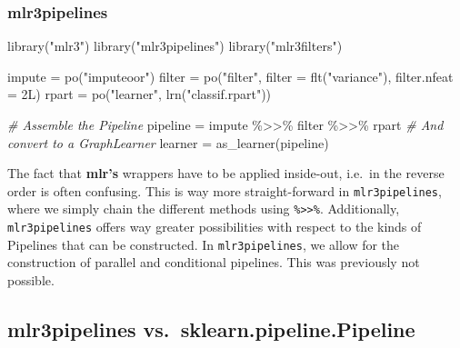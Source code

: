 \documentclass[
]{scrbook}
\newenvironment{Shaded}{\begin{snugshade}}{\end{snugshade}}
\newcommand{\AttributeTok}[1]{\textcolor[rgb]{0.77,0.63,0.00}{#1}}
\newcommand{\CommentTok}[1]{\textcolor[rgb]{0.56,0.35,0.01}{\textit{#1}}}
\newcommand{\FunctionTok}[1]{\textcolor[rgb]{0.00,0.00,0.00}{#1}}
\newcommand{\NormalTok}[1]{#1}
\newcommand{\OtherTok}[1]{\textcolor[rgb]{0.56,0.35,0.01}{#1}}
\newcommand{\SpecialCharTok}[1]{\textcolor[rgb]{0.00,0.00,0.00}{#1}}
\newcommand{\StringTok}[1]{\textcolor[rgb]{0.31,0.60,0.02}{#1}}
\renewenvironment{Shaded} {\begin{snugshade}\small} {\end{snugshade}}
\begin{document}
\hypertarget{mlr3pipelines}{%
\subsubsection{mlr3pipelines}\label{mlr3pipelines}}

\begin{Shaded}
\begin{Highlighting}[]
\FunctionTok{library}\NormalTok{(}\StringTok{"mlr3"}\NormalTok{)}
\FunctionTok{library}\NormalTok{(}\StringTok{"mlr3pipelines"}\NormalTok{)}
\FunctionTok{library}\NormalTok{(}\StringTok{"mlr3filters"}\NormalTok{)}

\NormalTok{impute }\OtherTok{=} \FunctionTok{po}\NormalTok{(}\StringTok{"imputeoor"}\NormalTok{)}
\NormalTok{filter }\OtherTok{=} \FunctionTok{po}\NormalTok{(}\StringTok{"filter"}\NormalTok{, }\AttributeTok{filter =} \FunctionTok{flt}\NormalTok{(}\StringTok{"variance"}\NormalTok{), }\AttributeTok{filter.nfeat =}\NormalTok{ 2L)}
\NormalTok{rpart }\OtherTok{=} \FunctionTok{po}\NormalTok{(}\StringTok{"learner"}\NormalTok{, }\FunctionTok{lrn}\NormalTok{(}\StringTok{"classif.rpart"}\NormalTok{))}

\CommentTok{\# Assemble the Pipeline}
\NormalTok{pipeline }\OtherTok{=}\NormalTok{ impute }\SpecialCharTok{\%\textgreater{}\textgreater{}\%}\NormalTok{ filter }\SpecialCharTok{\%\textgreater{}\textgreater{}\%}\NormalTok{ rpart}
\CommentTok{\# And convert to a \textquotesingle{}GraphLearner\textquotesingle{}}
\NormalTok{learner }\OtherTok{=} \FunctionTok{as\_learner}\NormalTok{(pipeline)}
\end{Highlighting}
\end{Shaded}

The fact that \textbf{mlr's} wrappers have to be applied inside-out, i.e.~in the reverse order is often confusing.
This is way more straight-forward in \texttt{mlr3pipelines}, where we simply chain the different methods using \texttt{\%\textgreater{}\textgreater{}\%}.
Additionally, \texttt{mlr3pipelines} offers way greater possibilities with respect to the kinds of Pipelines that can be constructed.
In \texttt{mlr3pipelines}, we allow for the construction of parallel and conditional pipelines.
This was previously not possible.

\hypertarget{mlr3pipelines-vs.-sklearn.pipeline.pipeline}{%
\subsection{mlr3pipelines vs.~sklearn.pipeline.Pipeline}\label{mlr3pipelines-vs.-sklearn.pipeline.pipeline}}
\end{document}
